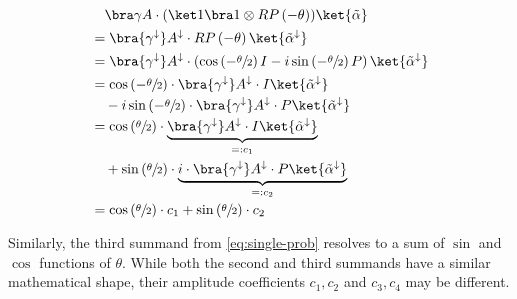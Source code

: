 \begin{equation}
    \label{eq:single-prob-simplification1}
    \begin{split}
            &\quad \bra\gamma A \cdot (\ket 1 \bra 1 \otimes RP\left(-\theta\right)) \ket{\tilde\alpha} \\
            &= \bra{\gamma^\downarrow} A^\downarrow \cdot RP\left(-\theta\right) \ket{\tilde\alpha^\downarrow} \\
            &= \bra{\gamma^\downarrow} A^\downarrow \cdot \left(\cos\left(-\sfrac\theta2\right) I - i \sin\left(-\sfrac\theta2\right) P\right) \ket{\tilde\alpha^\downarrow} \\
            &= \cos\left(-\sfrac\theta2\right) \cdot \bra{\gamma^\downarrow} A^\downarrow \cdot I \ket{\tilde\alpha^\downarrow} \\
                &\quad - i \sin\left(-\sfrac\theta2\right) \cdot \bra{\gamma^\downarrow} A^\downarrow \cdot P \ket{\tilde\alpha^\downarrow} \\
            &= \cos\left(\sfrac\theta2\right) \cdot \underbrace{\bra{\gamma^\downarrow} A^\downarrow \cdot I \ket{\tilde\alpha^\downarrow}}_{=: c_1} \\
                &\quad + \sin\left(\sfrac\theta2\right) \cdot \underbrace{i \cdot \bra{\gamma^\downarrow} A^\downarrow \cdot P \ket{\tilde\alpha^\downarrow}}_{=: c_2} \\
            &= \cos\left(\sfrac\theta2\right) \cdot c_1 + \sin\left(\sfrac\theta2\right) \cdot c_2
    \end{split}
\end{equation}

Similarly, the third summand from \autoref{eq:single-prob} resolves to a
sum of $\sin$ and $\cos$ functions of $\theta$.
While both the second and third summands have a similar mathematical shape,
their amplitude coefficients $c_1, c_2$ and $c_3, c_4$ may be different.

